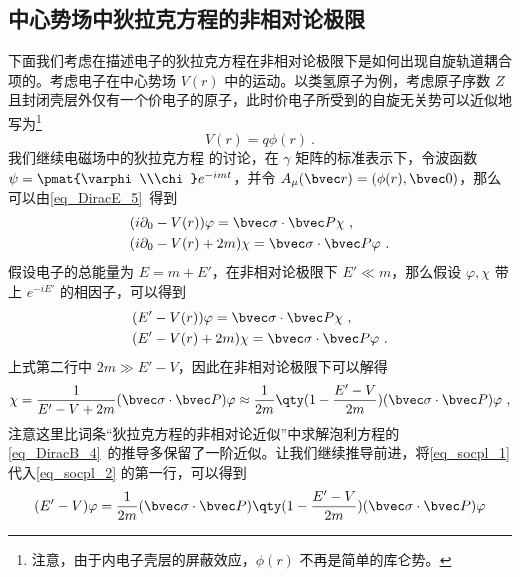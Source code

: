 \subsection{中心势场中狄拉克方程的非相对论极限}
\cite{曾谨言}下面我们考虑在描述电子的狄拉克方程在非相对论极限下是如何出现自旋轨道耦合项的。考虑电子在中心势场 $V(r)$ 中的运动。以类氢原子为例，考虑原子序数 $Z$ 且封闭壳层外仅有一个价电子的原子，此时价电子所受到的自旋无关势可以近似地写为\footnote{注意，由于内电子壳层的屏蔽效应，$\phi(r)$ 不再是简单的库仑势。}
\begin{equation}
V(r)=q\phi(r)~.
\end{equation}
我们继续电磁场中的狄拉克方程 的讨论，在 $\gamma$ 矩阵的标准表示下，令波函数 $\psi=\pmat{\varphi\\\chi}e^{-imt}$，并令 $A_\mu(\bvec r)=(\phi(r),\bvec 0)$，那么可以由\autoref{eq_DiracE_5}~得到
\begin{equation}
\begin{aligned}
&(i\partial_0 - V(r))\varphi = \bvec \sigma\cdot \bvec P \chi~,\\
&(i\partial_0 - V(r) + 2m) \chi = \bvec \sigma\cdot \bvec P  \varphi~.
\end{aligned}
\end{equation}
假设电子的总能量为 $E=m+E'$，在非相对论极限下 $E'\ll m$，那么假设 $\varphi,\chi$ 带上 $e^{-iE'}$ 的相因子，可以得到
\begin{equation}\label{eq_socpl_2}
\begin{aligned}
&(E' - V(r))\varphi = \bvec \sigma\cdot \bvec P \chi~,\\
&(E' - V(r) + 2m) \chi = \bvec \sigma\cdot \bvec P  \varphi~.
\end{aligned}
\end{equation}
上式第二行中 $2m\gg E'-V$，因此在非相对论极限下可以解得
\begin{equation}\label{eq_socpl_1}
\chi = \frac{1}{E'-V+2m}(\bvec \sigma\cdot \bvec P)\varphi
\approx\frac{1}{2m}\qty(1-\frac{E'-V}{2m})(\bvec \sigma\cdot \bvec P) \varphi~,
\end{equation}
注意这里比词条“狄拉克方程的非相对论近似”中求解泡利方程的\autoref{eq_DiracB_4}~的推导多保留了一阶近似。让我们继续推导前进，将\autoref{eq_socpl_1} 代入\autoref{eq_socpl_2} 的第一行，可以得到
\begin{equation}
(E'-V)\varphi = \frac{1}{2m}(\bvec \sigma\cdot \bvec P)\qty(1-\frac{E'-V}{2m})(\bvec \sigma\cdot \bvec P)\varphi
\end{equation}
